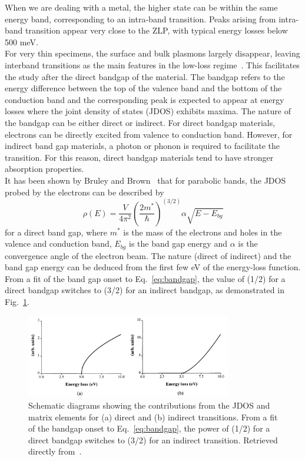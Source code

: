 When we are dealing with a metal, the higher state can be within the same energy band, corresponding to 
an intra-band transition.
%
Peaks arising from intra-band transition appear very close to the ZLP, with typical energy losses 
below 500 meV.\\

For very thin specimens, the surface and bulk plasmons largely disappear, leaving
interband transitions as the main features in the low-loss regime~\cite{Egerton:1996}.
%
This facilitates the study after the direct bandgap of the material.
%
The  bandgap  refers  to  the  energy  difference between the top of the valence band 
and the bottom of the conduction band and the corresponding peak is expected to appear 
at energy losses where the joint density of states (JDOS) exhibits maxima. 
%
The nature of the bandgap can be either direct or indirect. For direct bandgap materials,
electrons can be directly excited from valence to conduction band. However, 
for indirect band gap materials, a photon or phonon is required to facilitate the transition.
%
For this reason, direct bandgap materials tend to have stronger absorption properties.\\


It has been shown by Bruley and Brown~\cite{Bruley:1987} that for parabolic bands, 
the JDOS probed by the electrons can be described by
\begin{equation}
\label{eq:bandgap}
    \rho(E) = \frac{V}{4\pi^2} \left( \frac{2m^*}{\hbar} \right)^{(3/2)} \alpha \sqrt{E-E_{bg}}
\end{equation}
for a direct band gap, where $m^*$ is the mass of the electrons and holes in the 
valence and conduction band, $E_{bg}$ is the band gap energy and $\alpha$ is the 
convergence angle of the electron beam.
The nature (direct of indirect) and the band gap energy can be deduced 
from the first few eV of the energy-loss function. 
%
From a fit of the band gap onset to Eq.~\ref{eq:bandgap}, 
the value of (1/2) for a direct bandgap switches to (3/2) for an indirect bandgap,
as demonstrated in Fig.~\ref{fig:bandgap}.

\begin{figure}[H]
    \centering
    \includegraphics[width=0.8\textwidth]{plots/bandgap.png}
    \caption{Schematic diagrams showing the contributions from the JDOS and matrix elements for (a) direct and (b) indirect transitions. From a fit of the bandgap onset to Eq.~\ref{eq:bandgap}, the power of (1/2) for a direct bandgap switches
    to (3/2) for an indirect transition.
    Retrieved directly from~\cite{Rafferty:1998}.}
    \label{fig:bandgap}
\end{figure}

